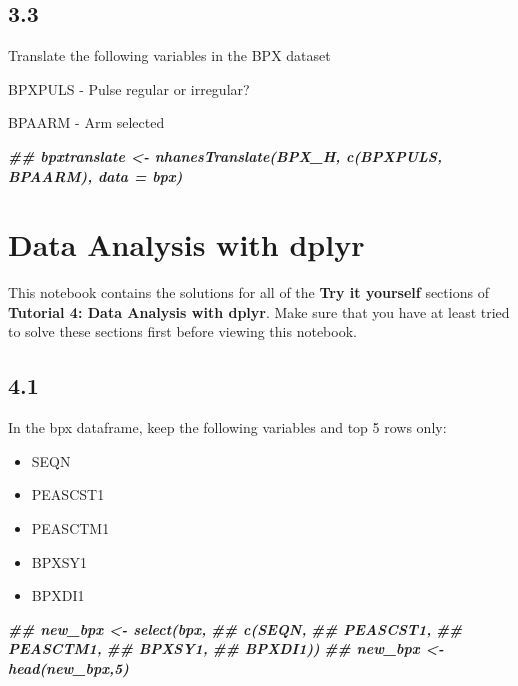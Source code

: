 \documentclass[
]{book}
\newenvironment{Shaded}{\begin{snugshade}}{\end{snugshade}}
\newcommand{\DocumentationTok}[1]{\textcolor[rgb]{0.56,0.35,0.01}{\textbf{\textit{#1}}}}
\providecommand{\tightlist}{%
  \setlength{\itemsep}{0pt}\setlength{\parskip}{0pt}}
\begin{document}
\hypertarget{section-16}{%
\subsection{3.3}\label{section-16}}

Translate the following variables in the BPX dataset

BPXPULS - Pulse regular or irregular?

BPAARM - Arm selected

\begin{Shaded}
\begin{Highlighting}[]
\DocumentationTok{\#\# bpxtranslate \textless{}{-} nhanesTranslate(\textquotesingle{}BPX\_H\textquotesingle{},  c(\textquotesingle{}BPXPULS\textquotesingle{}, \textquotesingle{}BPAARM\textquotesingle{}), data = bpx)}
\end{Highlighting}
\end{Shaded}

\hypertarget{data-analysis-with-dplyr-1}{%
\section{Data Analysis with dplyr}\label{data-analysis-with-dplyr-1}}

This notebook contains the solutions for all of the \textbf{Try it yourself} sections of \textbf{Tutorial 4: Data Analysis with dplyr}. Make sure that you have at least tried to solve these sections first before viewing this notebook.

\hypertarget{section-17}{%
\subsection{4.1}\label{section-17}}

In the bpx dataframe, keep the following variables and top 5 rows only:

\begin{itemize}
\tightlist
\item
  SEQN
\item
  PEASCST1
\item
  PEASCTM1
\item
  BPXSY1
\item
  BPXDI1
\end{itemize}

\begin{Shaded}
\begin{Highlighting}[]
\DocumentationTok{\#\# new\_bpx \textless{}{-} select(bpx,}
\DocumentationTok{\#\#                    c(SEQN,}
\DocumentationTok{\#\#                     PEASCST1,}
\DocumentationTok{\#\#                     PEASCTM1,}
\DocumentationTok{\#\#                     BPXSY1,}
\DocumentationTok{\#\#                     BPXDI1))}
\DocumentationTok{\#\# new\_bpx \textless{}{-} head(new\_bpx,5)}
\end{Highlighting}
\end{Shaded}
\end{document}
